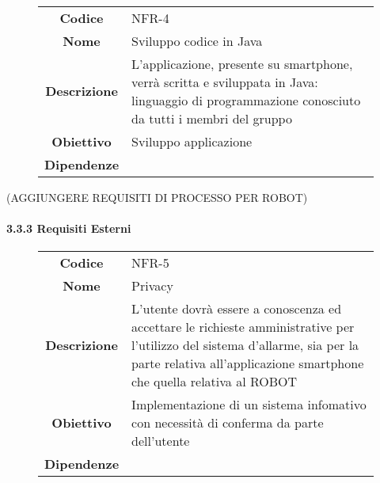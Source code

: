 \documentclass[]{article}
\let\oldparagraph\paragraph
\renewcommand{\paragraph}[1]{\oldparagraph{#1}\mbox{}}
\begin{document}
~

\begin{figure}[htbp]
\centering
\begin{tabular}{|c|l|}
\hline

\textbf{Codice}
 & 
NFR-4
\\

\textbf{Nome}
 & 
Sviluppo codice in Java
\\

\textbf{Descrizione}
 & 
L'applicazione, presente su smartphone, verrà scritta e sviluppata in
Java: linguaggio di programmazione conosciuto da tutti i membri del
gruppo
\\

\textbf{Obiettivo}
 & 
Sviluppo applicazione
\\

\textbf{Dipendenze}
 & 

\\
\hline
\end{tabular}
\end{figure}

(AGGIUNGERE REQUISITI DI PROCESSO PER ROBOT)

\hypertarget{requisiti-esterni}{%
\paragraph{3.3.3 Requisiti Esterni}\label{requisiti-esterni}}

\begin{figure}[htbp]
\centering
\begin{tabular}{|c|l|}
\hline

\textbf{Codice}
 & 
NFR-5
\\

\textbf{Nome}
 & 
Privacy
\\

\textbf{Descrizione}
 & 
L'utente dovrà essere a conoscenza ed accettare le richieste
amministrative per l'utilizzo del sistema d'allarme, sia per la parte
relativa all'applicazione smartphone che quella relativa al ROBOT
\\

\textbf{Obiettivo}
 & 
Implementazione di un sistema infomativo con necessità di conferma da
parte dell'utente
\\

\textbf{Dipendenze}
 & 

\\
\hline
\end{tabular}
\end{figure}
\end{document}
